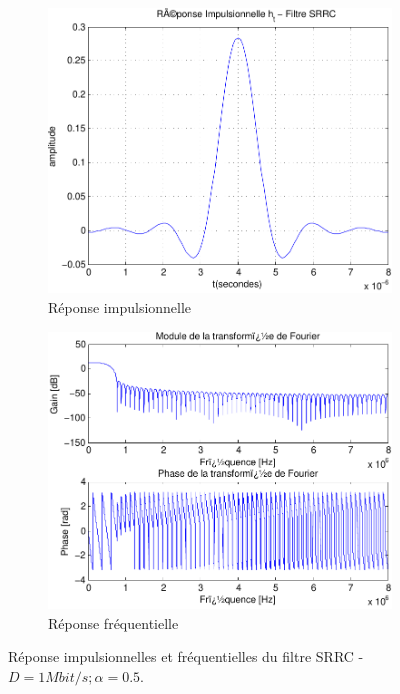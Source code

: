 \documentclass[a4paper,11pt]{article}
\begin{document}
\begin{figure}
	\begin{subfigure}{.5\textwidth}
  		\centering
  		\includegraphics[width=1\linewidth]{impul_srrc-crop.pdf}
  		\caption{Réponse impulsionnelle}
  		\label{fig:srrc_impul1M}
	\end{subfigure}
	\begin{subfigure}{.5\textwidth}
  		\centering
  		\includegraphics[width=1\linewidth]{frec_srrc-crop.pdf}
  		\caption{Réponse fréquentielle}
  		\label{fig:srrc_frec1M}
	\end{subfigure}%
	\caption{Réponse impulsionnelles et fréquentielles du filtre SRRC - $D=1 Mbit/s ; \alpha =0.5$.}
	\label{fig:srrc1M}
\end{figure} 
\end{document}
